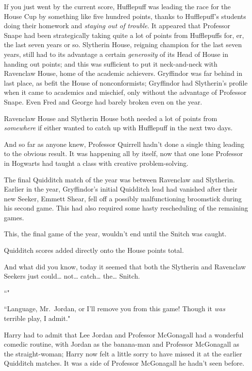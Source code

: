 If you just went by the current score, Hufflepuff was leading the race for the House Cup by something like five hundred points, thanks to Hufflepuff's students doing their homework and \emph{staying out of trouble}. It appeared that Professor Snape had been strategically taking quite a lot of points from Hufflepuffs for, er, the last seven years or so. Slytherin House, reigning champion for the last seven years, still had to its advantage a certain \emph{generosity} of its Head of House in handing out points; and this was sufficient to put it neck-and-neck with Ravenclaw House, home of the academic achievers. Gryffindor was far behind in last place, as befit the House of nonconformists; Gryffindor had Slytherin's profile when it came to academics and mischief, only without the advantage of Professor Snape. Even Fred and George had barely broken even on the year.

Ravenclaw House and Slytherin House both needed a lot of points from \emph{somewhere} if either wanted to catch up with Hufflepuff in the next two days.

And so far as anyone knew, Professor Quirrell hadn't done a single thing leading to the obvious result. It was happening all by itself, now that one lone Professor in Hogwarts had taught a class with creative problem-solving.

The final Quidditch match of the year was between Ravenclaw and Slytherin. Earlier in the year, Gryffindor's initial Quidditch lead had vanished after their new Seeker, Emmett Shear, fell off a possibly malfunctioning broomstick during his second game. This had also required some hasty rescheduling of the remaining games.

This, the final game of the year, wouldn't end until the Snitch was caught.

Quidditch scores added directly onto the House points total.

And what did you know, today it seemed that both the Slytherin and Ravenclaw Seekers just could{\ldots} not{\ldots} catch{\ldots} the{\ldots} Snitch.

``"

``Language, Mr.~Jordan, or I'll remove you from this game! Though it \emph{was} terrible play, I admit."

Harry had to admit that Lee Jordan and Professor McGonagall had a wonderful comedic routine, with Jordan as the banana-man and Professor McGonagall as the straight-woman; Harry now felt a little sorry to have missed it at the earlier Quidditch matches. It was a side of Professor McGonagall he hadn't seen before.

